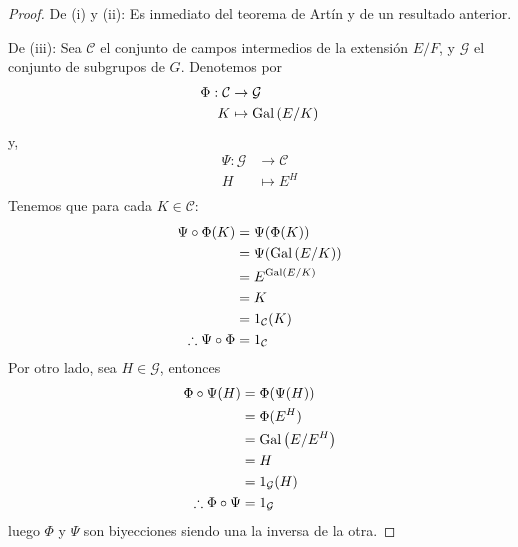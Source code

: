 \documentclass[12pt]{report}
\theoremstyle{largebreak}
\begin{document}
    \begin{proof}
        De (i) y (ii): Es inmediato del teorema de Artín y de un resultado anterior.

        De (iii): Sea $\mathcal{C}$ el conjunto de campos intermedios de la extensión $E/F$, y $\mathcal{G}$ el conjunto de subgrupos de $G$. Denotemos por
        \begin{equation*}
            \begin{split}
                \Phi:\mathcal{C}&\rightarrow \mathcal{G}\\
                K&\mapsto \textup{Gal}\left(E/K\right)\\
            \end{split}
        \end{equation*}
        y,
        \begin{equation*}
            \begin{split}
                \Psi:\mathcal{G}&\rightarrow \mathcal{C}\\
                H&\mapsto E^H\\
            \end{split}
        \end{equation*}
        Tenemos que para cada $K\in\mathcal{C}$:
        \begin{equation*}
            \begin{split}
                \Psi\circ\Phi(K)&=\Psi(\Phi(K))\\
                &=\Psi(\textup{Gal}\left(E/K\right))\\
                &=E^{\textup{Gal}\left(E/K\right)}\\
                &=K\\
                &=1_{\mathcal{C}}(K)\\
                \therefore \Psi\circ\Phi&=1_{\mathcal{C}}\\
            \end{split}
        \end{equation*}
        Por otro lado, sea $H\in\mathcal{G}$, entonces
        \begin{equation*}
            \begin{split}
                \Phi\circ\Psi(H)&=\Phi(\Psi(H))\\
                &=\Phi(E^H)\\
                &=\textup{Gal}\left(E/E^H\right)\\
                &=H\\
                &=1_{\mathcal{G}}(H)\\
                \therefore \Phi\circ\Psi&=1_{\mathcal{G}}\\
            \end{split}
        \end{equation*}
        luego $\Phi$ y $\Psi$ son biyecciones siendo una la inversa de la otra.


\end{proof}
\end{document}
